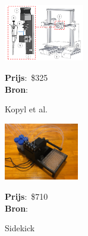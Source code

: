 \begin{minipage}[t]{0.249\textwidth}
    \vspace{0pt}
    \begin{figure}[H]
        \centering
        \captionsetup{width=0.85\textwidth} %
        \includegraphics[height=2.5cm]{figures/kopyl-et-al.png}
        \caption{Kopyl et al.}\label{fig:kopyl}
        \textbf{Prijs}:\ \$325\\
        \textbf{Bron}:\ \cite{RN42}
    \end{figure}
\end{minipage}
\begin{minipage}[t]{0.249\textwidth}
    \vspace{0pt}
    \begin{figure}[H]
        \centering
        \captionsetup{width=0.85\textwidth} %
        \includegraphics[height=2.5cm]{figures/Sidekick.png}
        \caption{Sidekick}\label{fig:Sidekick}
        \textbf{Prijs}:\ \$710\\
        \textbf{Bron}:\ \cite{RN41}
    \end{figure}
\end{minipage}\\